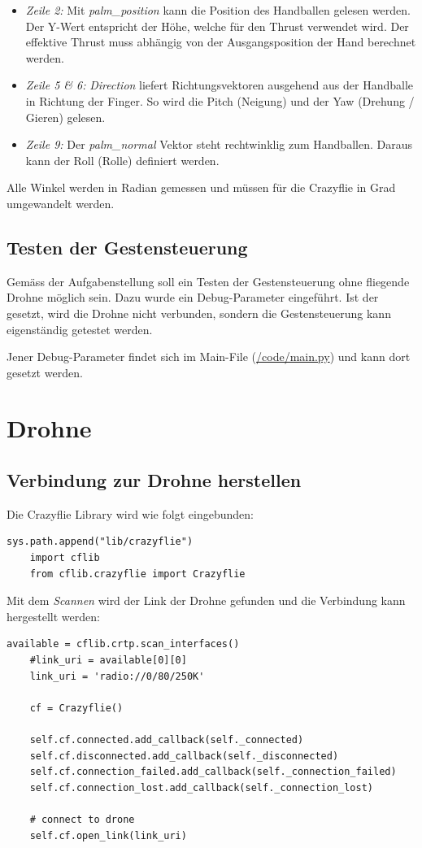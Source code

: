 \begin{itemize}
	\item \textit{Zeile 2:}
	Mit \textit{palm\_position} kann die Position des Handballen gelesen werden.
	Der Y-Wert entspricht der Höhe, welche für den Thrust verwendet wird.
	Der effektive Thrust muss abhängig von der Ausgangsposition der Hand berechnet werden.
	
	\item \textit{Zeile 5 \& 6:}
	\textit{Direction} liefert Richtungsvektoren ausgehend aus der Handballe in Richtung der Finger. So wird die Pitch (Neigung) und der Yaw (Drehung / Gieren) gelesen.
	
	\item \textit{Zeile 9:}
	Der \textit{palm\_normal} Vektor steht rechtwinklig zum Handballen. Daraus kann der Roll (Rolle) definiert werden.
\end{itemize}

Alle Winkel werden in Radian gemessen und müssen für die Crazyflie in Grad umgewandelt werden.

\subsection{Testen der Gestensteuerung}
Gemäss der Aufgabenstellung soll ein Testen der Gestensteuerung ohne fliegende Drohne möglich sein.
Dazu wurde ein Debug-Parameter eingeführt.
Ist der gesetzt, wird die Drohne nicht verbunden, sondern die Gestensteuerung kann eigenständig getestet werden.

Jener Debug-Parameter findet sich im Main-File (\href{https://github.com/MrJack91/droneGestures/blob/master/code/main.py}{/code/main.py}) und kann dort gesetzt werden.


\section{Drohne}
\subsection{Verbindung zur Drohne herstellen}
Die Crazyflie Library wird wie folgt eingebunden:
\begin{lstlisting}[style=lstStyleCpp]
	sys.path.append("lib/crazyflie")
	import cflib
	from cflib.crazyflie import Crazyflie
\end{lstlisting}

Mit dem \textit{Scannen} wird der Link der Drohne gefunden und die Verbindung kann hergestellt werden:
\begin{lstlisting}[style=lstStyleCpp]
	available = cflib.crtp.scan_interfaces()
	#link_uri = available[0][0]
	link_uri = 'radio://0/80/250K'
	
	cf = Crazyflie()
	
	self.cf.connected.add_callback(self._connected)
	self.cf.disconnected.add_callback(self._disconnected)
	self.cf.connection_failed.add_callback(self._connection_failed)
	self.cf.connection_lost.add_callback(self._connection_lost)
	
	# connect to drone
	self.cf.open_link(link_uri)
\end{lstlisting}

